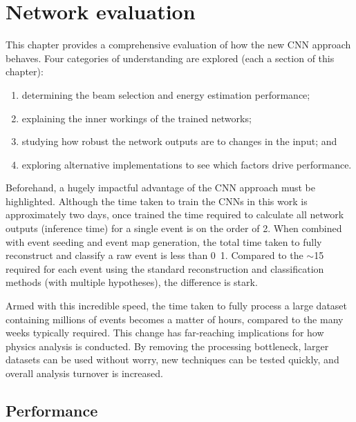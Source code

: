 \chapter{Network evaluation} %
\label{chap:results} %

This chapter provides a comprehensive evaluation of how the new CNN approach behaves. Four
categories of understanding are explored (each a section of this chapter):
\begin{enumerate}
    \item determining the beam selection and energy estimation performance;
    \item explaining the inner workings of the trained networks;
    \item studying how robust the network outputs are to changes in the input; and
    \item exploring alternative implementations to see which factors drive performance.
\end{enumerate}

Beforehand, a hugely impactful advantage of the CNN approach must be highlighted. Although the
time taken to train the CNNs in this work is approximately two days, once trained the time
required to calculate all network outputs (inference time) for a single event is on the order of
\unit{2}{}. When combined with event seeding and event map generation, the total time
taken to fully reconstruct and classify a raw event is less than \unit{0.1}{}.
Compared to the $\sim$\unit{15}{} required for each event using the standard
reconstruction and classification methods (with multiple hypotheses), the difference is stark.

Armed with this incredible speed, the time taken to fully process a large dataset containing
millions of events becomes a matter of hours, compared to the many weeks typically required. This
change has far-reaching implications for how physics analysis is conducted. By removing the
processing bottleneck, larger datasets can be used without worry, new techniques can be tested
quickly, and overall analysis turnover is increased.

\section{Performance} %
\label{sec:results_eval} %

